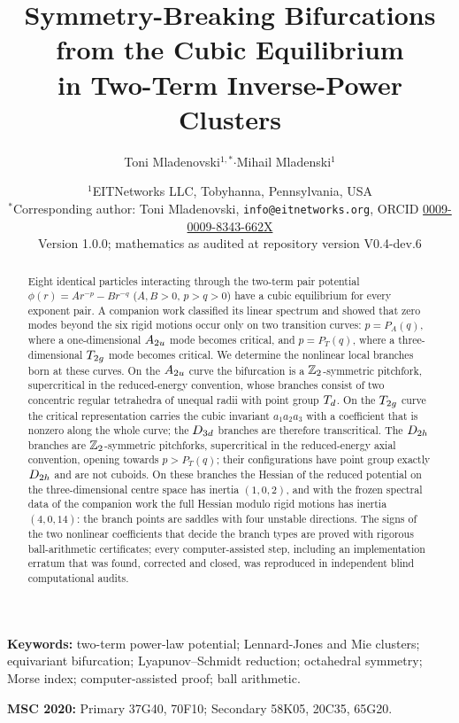 \documentclass[11pt]{article}
\title{Symmetry-Breaking Bifurcations from the Cubic Equilibrium\\ in Two-Term Inverse-Power Clusters}
\author{Toni Mladenovski$^{1,*}$\quad$\cdot$\quad Mihail Mladenski$^{1}$}
\date{\small $^{1}$EITNetworks LLC, Tobyhanna, Pennsylvania, USA\\[2pt]
$^{*}$Corresponding author: Toni Mladenovski, \texttt{info@eitnetworks.org}, ORCID
\href{https://orcid.org/0009-0009-8343-662X}{0009-0009-8343-662X}\\[6pt]
Version 1.0.0; mathematics as audited at repository version V0.4-dev.6}
\begin{document}
\maketitle

\begin{abstract}
Eight identical particles interacting through the two-term pair potential $\phi(r)=Ar^{-p}-Br^{-q}$ ($A,B>0$,
$p>q>0$) have a cubic equilibrium for every exponent pair. A companion work classified its linear spectrum and showed
that zero modes beyond the six rigid motions occur only on two transition curves: $p=P_A(q)$, where a one-dimensional
$A_{2u}$ mode becomes critical, and $p=P_T(q)$, where a three-dimensional $T_{2g}$ mode becomes critical. We determine
the nonlinear local branches born at these curves. On the $A_{2u}$ curve the bifurcation is a $\mathbb{Z}_2$-symmetric
pitchfork, supercritical in the reduced-energy convention, whose branches consist of two concentric regular tetrahedra
of unequal radii with point group $T_{d}$. On the $T_{2g}$ curve the critical representation carries the cubic invariant
$a_1a_2a_3$ with a coefficient that is nonzero along the whole curve; the $D_{3d}$ branches are therefore
transcritical. The $D_{2h}$ branches are $\mathbb{Z}_2$-symmetric pitchforks, supercritical in the reduced-energy axial
convention, opening towards $p>P_T(q)$; their configurations have point group exactly $D_{2h}$ and are not cuboids. On
these branches the Hessian of the reduced potential on the three-dimensional centre space has inertia $(1,0,2)$, and
with the frozen spectral data of the companion work the full Hessian modulo rigid motions has inertia $(4,0,14)$:
the branch points are saddles with four unstable directions. The signs of the two nonlinear coefficients that decide
the branch types are proved with rigorous ball-arithmetic certificates; every computer-assisted step, including an
implementation erratum that was found, corrected and closed, was reproduced in independent blind computational audits.
\end{abstract}

\medskip
\noindent\textbf{Keywords:} two-term power-law potential; Lennard-Jones and Mie clusters; equivariant bifurcation;
Lyapunov--Schmidt reduction; octahedral symmetry; Morse index; computer-assisted proof; ball arithmetic.

\noindent\textbf{MSC 2020:} Primary 37G40, 70F10; Secondary 58K05, 20C35, 65G20.

\tableofcontents















\appendix







\end{document}
